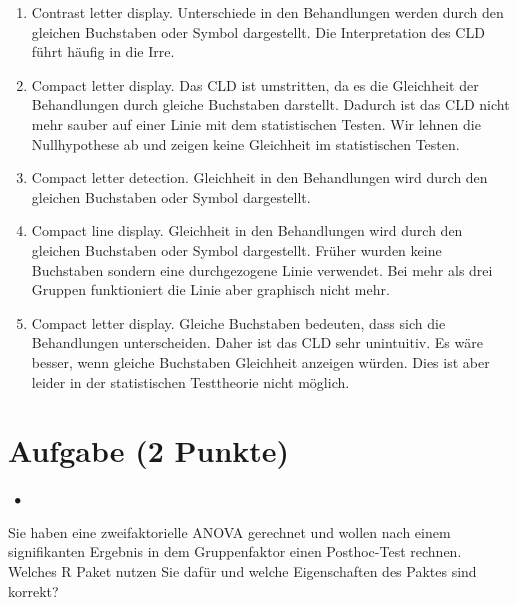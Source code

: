 \documentclass[a4paper, 9pt]{scrartcl}\usepackage[]{graphicx}\usepackage[]{xcolor}
\begin{document}
\begin{enumerate}
\item [\textbf{A} \msquare] Contrast letter display. Unterschiede in den Behandlungen werden durch den gleichen Buchstaben oder Symbol dargestellt. Die Interpretation des CLD führt häufig in die Irre.
\item [\textbf{B} \msquare] Compact letter display. Das CLD ist umstritten, da es die Gleichheit der Behandlungen durch gleiche Buchstaben darstellt. Dadurch ist das CLD nicht mehr sauber auf einer Linie mit dem statistischen Testen. Wir lehnen die Nullhypothese ab und zeigen keine Gleichheit im statistischen Testen.
\item [\textbf{C} \msquare] Compact letter detection. Gleichheit in den Behandlungen wird durch den gleichen Buchstaben oder Symbol dargestellt.
\item [\textbf{D} \msquare] Compact line display. Gleichheit in den Behandlungen wird durch den gleichen Buchstaben oder Symbol dargestellt. Früher wurden keine Buchstaben sondern eine durchgezogene Linie verwendet. Bei mehr als drei Gruppen funktioniert die Linie aber graphisch nicht mehr.
\item [\textbf{E} \msquare] Compact letter display. Gleiche Buchstaben bedeuten, dass sich die Behandlungen unterscheiden. Daher ist das CLD sehr unintuitiv. Es wäre besser, wenn gleiche Buchstaben Gleichheit anzeigen würden. Dies ist aber leider in der statistischen Testtheorie nicht möglich.
\end{enumerate}

\section{Aufgabe \hfill (2 Punkte)}

\ifcollection
\begin{flushright}
\tiny\vspace{-2Ex}
\textbf{\examinhaltstart}
\exammodulestatversuch $\;\bullet$
\exammodulebiostat
\vspace{-1Ex}
\end{flushright}
\fi




Sie haben eine zweifaktorielle ANOVA gerechnet und wollen nach einem signifikanten Ergebnis in dem Gruppenfaktor einen Posthoc-Test rechnen. Welches R Paket nutzen Sie dafür und welche Eigenschaften des Paktes sind korrekt?
\end{document}
